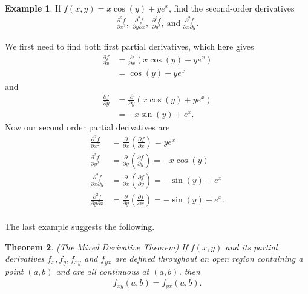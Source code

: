\documentclass[12pt, letter]{article}
\theoremstyle{plain}
\newtheorem{theorem}{Theorem}
\numberwithin{theorem}{section}
\theoremstyle{definition}
\newtheorem{example}[theorem]{Example}
\begin{document}
\begin{example}
If $f(x,y) = x\cos(y) + ye^x$, find the second-order derivatives
\begin{align*}
\frac{\partial^2 f}{\partial x^2}, \ \frac{\partial^2 f}{\partial y \partial x}, \ \frac{\partial^2 f}{\partial y^2}, \ \text{and} \ \frac{\partial^2 f}{\partial x \partial y}.
\end{align*}

\smallskip

We first need to find both first partial derivatives, which here gives
\begin{align*}
\frac{\partial f}{\partial x} &= \frac{\partial}{\partial x} (x\cos(y)+ye^x)\\
&=\cos(y)+ye^x
\end{align*}
and
\begin{align*}
\frac{\partial f}{\partial y} &= \frac{\partial}{\partial y} (x\cos(y)+ye^x)\\
&=-x\sin(y)+e^x.
\end{align*}
Now our second order partial derivatives are
\begin{align*}
\frac{\partial^2 f}{\partial x^2} &= \frac{\partial}{\partial x} \left(\frac{\partial f}{\partial x}\right) = ye^x\\
\frac{\partial^2 f}{\partial y^2} &= \frac{\partial}{\partial y} \left(\frac{\partial f}{\partial y}\right) = -x\cos(y)\\
\frac{\partial^2 f}{\partial x \partial y} &= \frac{\partial}{\partial x} \left(\frac{\partial f}{\partial y}\right) = -\sin(y)+e^x\\
\frac{\partial^2 f}{\partial y \partial x} &= \frac{\partial}{\partial y} \left(\frac{\partial f}{\partial x}\right) = -\sin(y)+e^x.\\
\end{align*}
\end{example}

\bigskip

\hrulefill

\bigskip

The last example suggests the following.

\bigskip

\begin{theorem}{(The Mixed Derivative Theorem)}
If $f(x,y)$ and its partial derivatives $f_x, f_y, f_{xy}$ and $f_{yx}$ are defined throughout an open region containing a point $(a,b)$ and are all continuous at $(a,b)$, then
\begin{align*}
f_{xy}(a,b) = f_{yx}(a,b).
\end{align*}
\end{theorem}
\end{document}
